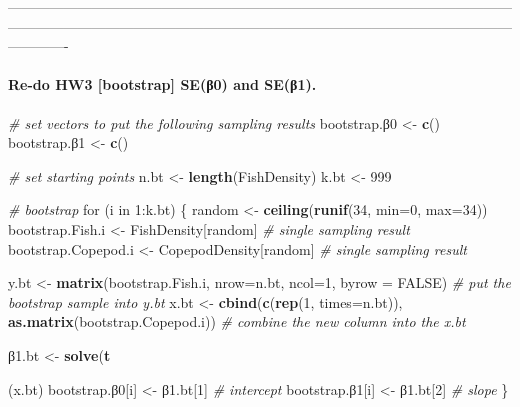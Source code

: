 \documentclass[]{article}
\newenvironment{Shaded}{\begin{snugshade}}{\end{snugshade}}
\newcommand{\KeywordTok}[1]{\textcolor[rgb]{0.13,0.29,0.53}{\textbf{{#1}}}}
\newcommand{\DataTypeTok}[1]{\textcolor[rgb]{0.13,0.29,0.53}{{#1}}}
\newcommand{\DecValTok}[1]{\textcolor[rgb]{0.00,0.00,0.81}{{#1}}}
\newcommand{\FloatTok}[1]{\textcolor[rgb]{0.00,0.00,0.81}{{#1}}}
\newcommand{\StringTok}[1]{\textcolor[rgb]{0.31,0.60,0.02}{{#1}}}
\newcommand{\CommentTok}[1]{\textcolor[rgb]{0.56,0.35,0.01}{\textit{{#1}}}}
\newcommand{\OtherTok}[1]{\textcolor[rgb]{0.56,0.35,0.01}{{#1}}}
\newcommand{\NormalTok}[1]{{#1}}
\let\oldparagraph\paragraph
\renewcommand{\paragraph}[1]{\oldparagraph{#1}\mbox{}}
\begin{document}
-------------------------------------------------------------------------------------------------------------------------------------------------------------------------------------------------------------------------------------

\paragraph{Re-do HW3 {[}bootstrap{]} SE(β0) and
SE(β1).}\label{re-do-hw3-bootstrap-se0-and-se1.}

\begin{Shaded}
\begin{Highlighting}[]
\CommentTok{# set vectors to put the following sampling results}
\NormalTok{bootstrap.β}\DecValTok{0} \NormalTok{<-}\StringTok{ }\KeywordTok{c}\NormalTok{() }
\NormalTok{bootstrap.β}\DecValTok{1} \NormalTok{<-}\StringTok{ }\KeywordTok{c}\NormalTok{()}

\CommentTok{# set starting points}
\NormalTok{n.bt <-}\StringTok{ }\KeywordTok{length}\NormalTok{(FishDensity) }
\NormalTok{k.bt <-}\StringTok{ }\DecValTok{999}

\CommentTok{# bootstrap}
\NormalTok{for (i in }\DecValTok{1}\NormalTok{:k.bt) \{}
\NormalTok{random <-}\StringTok{ }\KeywordTok{ceiling}\NormalTok{(}\KeywordTok{runif}\NormalTok{(}\DecValTok{34}\NormalTok{, }\DataTypeTok{min=}\DecValTok{0}\NormalTok{, }\DataTypeTok{max=}\DecValTok{34}\NormalTok{))}
\NormalTok{bootstrap.Fish.i <-}\StringTok{ }\NormalTok{FishDensity[random] }\CommentTok{# single sampling result}
\NormalTok{bootstrap.Copepod.i <-}\StringTok{ }\NormalTok{CopepodDensity[random] }\CommentTok{# single sampling result}

\NormalTok{y.bt  <-}\StringTok{ }\KeywordTok{matrix}\NormalTok{(bootstrap.Fish.i, }\DataTypeTok{nrow=}\NormalTok{n.bt, }\DataTypeTok{ncol=}\DecValTok{1}\NormalTok{, }\DataTypeTok{byrow =} \OtherTok{FALSE}\NormalTok{) }\CommentTok{# put the bootstrap sample into y.bt}
\NormalTok{x.bt  <-}\StringTok{ }\KeywordTok{cbind}\NormalTok{(}\KeywordTok{c}\NormalTok{(}\KeywordTok{rep}\NormalTok{(}\DecValTok{1}\NormalTok{, }\DataTypeTok{times=}\NormalTok{n.bt)), }\KeywordTok{as.matrix}\NormalTok{(bootstrap.Copepod.i)) }\CommentTok{# combine the new column into the x.bt}

\NormalTok{β}\FloatTok{1.}\NormalTok{bt <-}\StringTok{ }\KeywordTok{solve}\NormalTok{(}\KeywordTok{t}\NormalTok{(x.bt) %*%}\StringTok{ }\NormalTok{x.bt) %*%}\StringTok{ }\KeywordTok{t}\NormalTok{(x.bt) %*%}\StringTok{ }\NormalTok{y.bt}
\NormalTok{bootstrap.β}\DecValTok{0}\NormalTok{[i] <-}\StringTok{ }\NormalTok{β}\FloatTok{1.}\NormalTok{bt[}\DecValTok{1}\NormalTok{] }\CommentTok{# intercept}
\NormalTok{bootstrap.β}\DecValTok{1}\NormalTok{[i] <-}\StringTok{ }\NormalTok{β}\FloatTok{1.}\NormalTok{bt[}\DecValTok{2}\NormalTok{] }\CommentTok{# slope}
\NormalTok{\}}

}
\end{Highlighting}
\end{Shaded}
\end{document}
